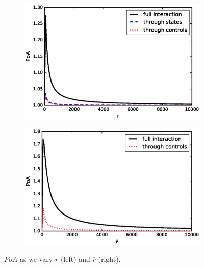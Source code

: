 \documentclass[11pt]{article}
\begin{document}
\begin{figure}[!htb]
	\centering
	\begin{subfigure}{.45\textwidth}
		\includegraphics[scale=0.5]{PoA_half_more_steps_r.eps}
	\end{subfigure}
	\begin{subfigure}{.45\textwidth}
		\includegraphics[scale=0.5]{PoA_half_more_steps_rbar.eps}
	\end{subfigure}
	\caption{$PoA$ as we vary $r$ (left) and $\bar{r}$ (right).}
	\label{fig:r_rbar}
\end{figure}
\end{document}
